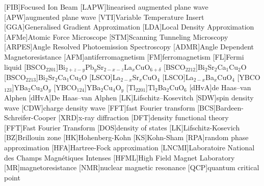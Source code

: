 
\cleardoublepage



[FIB]{Focused Ion Beam}
[LAPW]{linearised augmented plane wave}
[APW]{augmented plane wave}
[VTI]{Variable Temperature Insert}
[GGA]{Generalised Gradient Approximation}
[LDA]{Local Density Approximation}
[AFMe]{Atomic Force Microscope}
[STM]{Scanning Tunneling Microscopy}
[ARPES]{Angle Resolved Photoemission Spectroscopy}
[ADMR]{Angle Dependent Magnetoresistance}
[AFM]{antiferromagnetism}
[FM]{ferromagnetism}
[FL]{Fermi liquid}
[BSCO$_{2201}$]{Bi$_{2+z-y}$Pb$_{y}$Sr$_{2-x-z}$La$_{x}$CuO$_{6+\delta}$}
[BSCO$_{2212}$]{Bi$_2$Sr$_2$Ca$_1$Cu$_2$O}
[BSCO$_{2213}$]{Bi$_2$Sr$_2$Ca$_1$Cu$_3$O}
[LSCO]{La$_{2-x}$Sr$_x$CuO$_4$}
[LSCO]{La$_{2-x}$Ba$_x$CuO$_4$}
[YBCO$_{123}$]{YBa$_2$Cu$_3$O$_y$}
[YBCO$_{124}$]{YBa$_2$Cu$_4$O$_y$}
[Tl$_{2201}$]{Tl$_2$Ba$_2$CuO$_6$}
[dHvA]{de Haas--van Alphen}
[dHvA]{De Haas--van Alphen}
[LK]{Lifschitz--Kosevitch}
[SDW]{spin density wave}
[CDW]{charge density wave}
[FFT]{fast Fourier transform}
[BCS]{Bardeen-Schreifer-Cooper}
[XRD]{x-ray diffraction}
[DFT]{density functional theory}
[FFT]{Fast Fourier Transform}
[DOS]{density of states}
[LK]{Lifschitz-Kosevich}
[BZ]{Brillouin zone}
[HK]{Hohenberg-Kohn}
[KS]{Kohn-Sham}
[RPA]{random phase approximation}
[HFA]{Hartree-Fock approximation}
[LNCMI]{Laboratoire National des Champs Magn\'{e}tiques Intenses} 
[HFML]{High Field Magnet Laboratory}
[MR]{magnetoresistance}
[NMR]{nuclear magnetic resonance}
[QCP]{quantum critical point}

